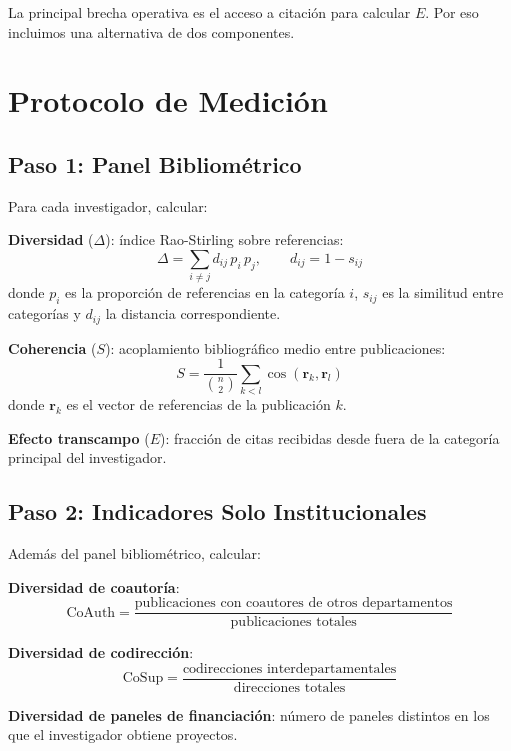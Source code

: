 \documentclass[
]{article}
\begin{document}
La principal brecha operativa es el acceso a citación para calcular
\(E\). Por eso incluimos una alternativa de dos componentes.

\hypertarget{protocolo-de-mediciuxf3n}{%
\section{Protocolo de Medición}\label{protocolo-de-mediciuxf3n}}

\hypertarget{paso-1-panel-bibliomuxe9trico}{%
\subsection{Paso 1: Panel
Bibliométrico}\label{paso-1-panel-bibliomuxe9trico}}

Para cada investigador, calcular:

\textbf{Diversidad} (\(\Delta\)): índice Rao-Stirling sobre referencias:
\[\Delta = \sum_{i \neq j} d_{ij}\, p_i\, p_j, \qquad d_{ij} = 1 - s_{ij}\]
donde \(p_i\) es la proporción de referencias en la categoría \(i\),
\(s_{ij}\) es la similitud entre categorías y \(d_{ij}\) la distancia
correspondiente.

\textbf{Coherencia} (\(S\)): acoplamiento bibliográfico medio entre
publicaciones:
\[S = \frac{1}{\binom{n}{2}} \sum_{k < l} \cos(\mathbf{r}_k, \mathbf{r}_l)\]
donde \(\mathbf{r}_k\) es el vector de referencias de la publicación
\(k\).

\textbf{Efecto transcampo} (\(E\)): fracción de citas recibidas desde
fuera de la categoría principal del investigador.

\hypertarget{paso-2-indicadores-solo-institucionales}{%
\subsection{Paso 2: Indicadores Solo
Institucionales}\label{paso-2-indicadores-solo-institucionales}}

Además del panel bibliométrico, calcular:

\textbf{Diversidad de coautoría}:
\[\text{CoAuth} = \frac{\text{publicaciones con coautores de otros departamentos}}{\text{publicaciones totales}}\]

\textbf{Diversidad de codirección}:
\[\text{CoSup} = \frac{\text{codirecciones interdepartamentales}}{\text{direcciones totales}}\]

\textbf{Diversidad de paneles de financiación}: número de paneles
distintos en los que el investigador obtiene proyectos.
\end{document}
